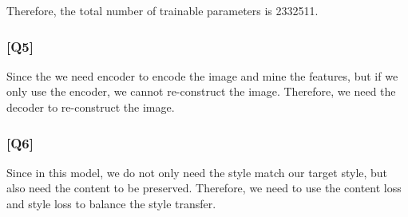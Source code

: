 \documentclass{article}
\begin{document}
Therefore, the total number of trainable parameters is 2332511.

\subsubsection*{[Q5]}
Since the we need encoder to encode the image and mine the features, but if we only use the encoder, we cannot re-construct the image. 
Therefore, we need the decoder to re-construct the image.

\subsubsection*{[Q6]}
Since in this model, we do not only need the style match our target style, but also need the content to be preserved.
Therefore, we need to use the content loss and style loss to balance the style transfer.
\end{document}
